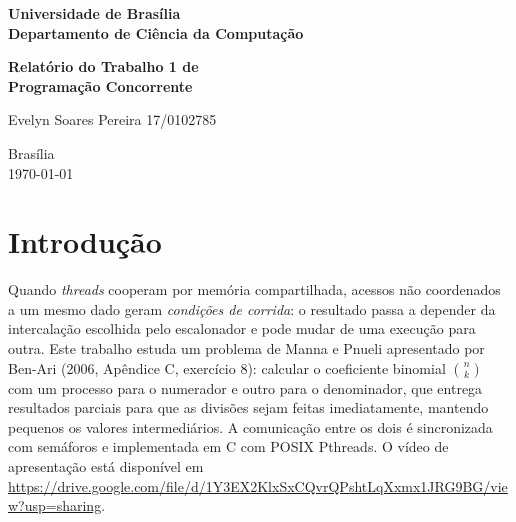 \documentclass[a4paper, 12pt]{article}
\begin{document}
\begin{titlepage}
\begin{center}
\textbf{\LARGE Universidade de Brasília}\\[0.5cm]
\textbf{\large Departamento de Ciência da Computação}\\[0.2cm]
\vspace{20pt}

\par
\vspace{32pt}
{\LARGE\bfseries Relatório do Trabalho 1 de\\[0.25cm] Programação Concorrente\par}
\vspace{30pt}
\Large {Evelyn Soares Pereira	17/0102785}\\[0.1cm]

\end{center}

\par
\vfill
\begin{center}
{{\normalsize Brasília}\\
{\normalsize \today}}
\end{center}
\end{titlepage}

\newpage


\section{Introdução}

Quando \emph{threads} cooperam por memória compartilhada, acessos não
coordenados a um mesmo dado geram \emph{condições de corrida}: o resultado
passa a depender da intercalação escolhida pelo escalonador e pode mudar de
uma execução para outra. Este trabalho estuda um problema de Manna e Pnueli
apresentado por Ben-Ari (2006, Apêndice C, exercício 8): calcular o
coeficiente binomial $\binom{n}{k}$ com um processo para o numerador e outro
para o denominador, que entrega resultados parciais para que as divisões
sejam feitas imediatamente, mantendo pequenos os valores intermediários. A
comunicação entre os dois é sincronizada com semáforos e implementada em C
com POSIX Pthreads. O vídeo de apresentação está disponível em
{\small\url{https://drive.google.com/file/d/1Y3EX2KlxSxCQvrQPshtLqXxmx1JRG9BG/view?usp=sharing}}.
\end{document}
